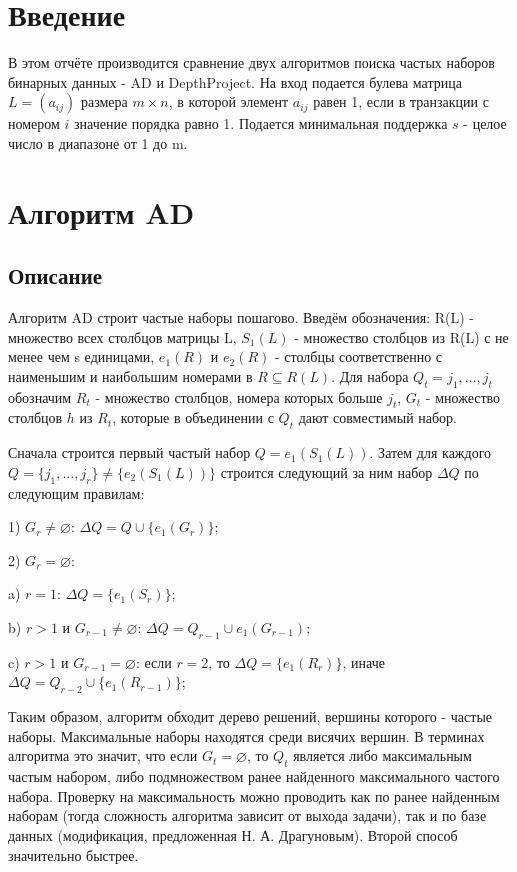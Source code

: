 \documentclass[a4paper, 12pt, oneside]{scrartcl}
\begin{document}
\section{Введение}

В этом отчёте производится сравнение двух алгоритмов поиска частых наборов бинарных данных - AD и DepthProject. На вход подается булева матрица $L = (a_{ij})$ размера $m \times n$, в которой элемент $a_{ij}$ равен 1, если в транзакции с номером $i$ значение порядка равно 1. Подается минимальная поддержка $s$ - целое число в диапазоне от 1 до m.

\section{Алгоритм AD}

\subsection{Описание}

Алгоритм AD строит частые наборы пошагово. Введём обозначения: R(L) - множество всех столбцов матрицы L, $S_1(L)$ - множество столбцов из R(L) с не менее чем s единицами, $e_1(R)$ и $e_2(R)$ - столбцы соответственно с наименьшим и наибольшим номерами в $R \subseteq R(L)$. Для набора $Q_t = {j_1, ..., j_t}$ обозначим $R_t$ - множество столбцов, номера которых больше $j_t$, $G_t$ - множество столбцов $h$ из $R_t$, которые в объединении с $Q_t$ дают совместимый набор.

Сначала строится первый частый набор $Q = {e_1(S_1(L))}$. Затем для каждого $Q = \{j_1, ..., j_r\} \neq \{e_2(S_1(L))\}$ строится следующий за ним набор $\Delta Q$ по следующим правилам:

1) $G_r \neq \varnothing$: $\Delta Q = Q \cup \{e_1(G_r)\}$;

2) $G_r = \varnothing$:

\qquad	a) $r = 1$: $\Delta Q = \{e_1(S_r)\}$;
	
\qquad	b) $r > 1$ и $G_{r-1} \neq \varnothing$: $\Delta Q = Q_{r-1} \cup {e_1(G_{r-1})}$;
	
\qquad	c) $r > 1$ и $G_{r-1} = \varnothing$: если $r = 2$, то $\Delta Q = \{e_1(R_r)\}$, иначе $\Delta Q = Q_{r-2} \cup \{e_1(R_{r-1})\}$;

Таким образом, алгоритм обходит дерево решений, вершины которого - частые наборы. Максимальные наборы находятся среди висячих вершин. В терминах алгоритма это значит, что если $G_t = \varnothing$, то $Q_t$ является либо максимальным частым набором, либо подмножеством ранее найденного максимального частого набора. Проверку на максимальность можно проводить как по ранее найденным наборам (тогда сложность алгоритма зависит от выхода задачи), так и по базе данных (модификация, предложенная Н. А. Драгуновым). Второй способ значительно быстрее.
\end{document}
